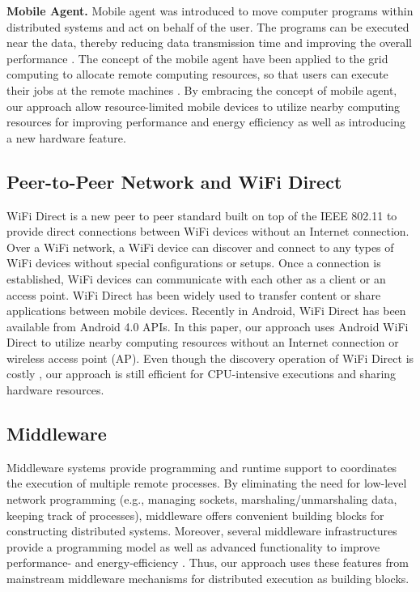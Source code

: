 \documentclass{sig-alternate}
\begin{document}
\textbf{Mobile Agent.} Mobile agent was introduced to move computer programs within distributed systems and act on behalf of the user. The programs can be executed near the data, thereby reducing data transmission time and improving the overall performance \cite{peine+:ma99}. The concept of the mobile agent have been applied to the grid computing to allocate remote computing resources, so that users can execute their jobs at the remote machines \cite{fukuda+:ma_grid03}. By embracing the concept of mobile agent, our approach allow resource-limited mobile devices to utilize nearby computing resources for improving performance and energy efficiency as well as introducing a new hardware feature.

\subsection{Peer-to-Peer Network and WiFi Direct}
WiFi Direct \cite{alliance2010wi} is a new peer to peer standard built on top of the IEEE 802.11 to provide direct connections between WiFi devices without an Internet connection. Over a WiFi network, a WiFi device can discover and connect to any types of WiFi devices without special configurations or setups. Once a connection is established, WiFi devices can communicate with each other as a client or an access point. WiFi Direct has been widely used to transfer content or share applications between mobile devices. Recently in Android, WiFi Direct has been available from Android 4.0 APIs. In this paper, our approach uses Android WiFi Direct \cite{wifi:p2p} to utilize nearby computing resources without an Internet connection or wireless access point (AP). Even though the discovery operation of WiFi Direct is costly \cite{trifunovic2013slicing}, our approach is still efficient for CPU-intensive executions and sharing hardware resources. 

\subsection{Middleware}
Middleware systems provide programming and runtime support to coordinates the execution of multiple remote processes. By eliminating the need for low-level network programming (e.g., managing sockets, marshaling/unmarshaling data, keeping track of processes), middleware offers convenient building blocks for constructing distributed systems. Moreover, several middleware infrastructures provide a programming model as well as advanced functionality to improve performance- and energy-efficiency \cite{kwon+:mobilesoft2015}. Thus, our approach uses these features from mainstream middleware mechanisms for distributed execution as building blocks. 
\end{document}
